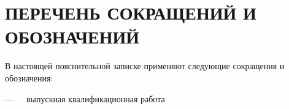 \chapter*{\hfill ПЕРЕЧЕНЬ СОКРАЩЕНИЙ И ОБОЗНАЧЕНИЙ\hfill}

В настоящей пояснительной записке применяют следующие сокращения и обозначения:

\begin{description}[font=\normalfont,style=multiline,leftmargin=5cm,itemindent=-0.9cm,nosep]
    \raggedright
    
	\item[ВКР]—\ \ \ 
	выпускная квалификационная работа 
    
\end{description}